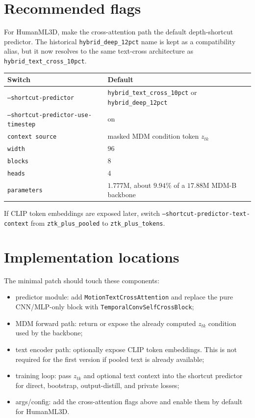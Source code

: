 \documentclass[11pt]{article}
\begin{document}
\section{Recommended flags}

For HumanML3D, make the cross-attention path the default depth-shortcut
predictor. The historical \texttt{hybrid\_deep\_12pct} name is kept as a
compatibility alias, but it now resolves to the same text-cross architecture as
\texttt{hybrid\_text\_cross\_10pct}.

\begin{center}
\begin{tabular}{ll}
\toprule
Switch & Default \\
\midrule
\texttt{--shortcut-predictor} & \texttt{hybrid\_text\_cross\_10pct} or \texttt{hybrid\_deep\_12pct} \\
\texttt{--shortcut-predictor-use-timestep} & on \\
\texttt{context source} & masked MDM condition token $z_{tk}$ \\
\texttt{width} & $96$ \\
\texttt{blocks} & $8$ \\
\texttt{heads} & $4$ \\
\texttt{parameters} & $1.777$M, about $9.94\%$ of a $17.88$M MDM-B backbone \\
\bottomrule
\end{tabular}
\end{center}

If CLIP token embeddings are exposed later, switch
\texttt{--shortcut-predictor-text-context} from \texttt{ztk\_plus\_pooled} to
\texttt{ztk\_plus\_tokens}.

\section{Implementation locations}

The minimal patch should touch these components:

\begin{itemize}
\item predictor module: add \texttt{MotionTextCrossAttention} and replace the
  pure CNN/MLP-only block with \texttt{TemporalConvSelfCrossBlock};
\item MDM forward path: return or expose the already computed $z_{tk}$ condition
  used by the backbone;
\item text encoder path: optionally expose CLIP token embeddings. This is not
  required for the first version if pooled text is already available;
\item training loop: pass $z_{tk}$ and optional text context into the shortcut
  predictor for direct, bootstrap, output-distill, and private losses;
\item args/config: add the cross-attention flags above and enable them by
  default for HumanML3D.
\end{itemize}
\end{document}
